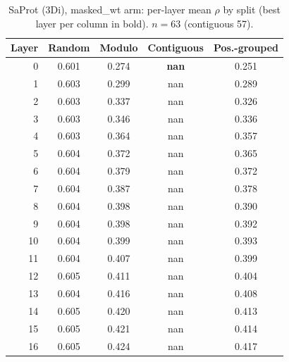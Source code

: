 \documentclass[11pt,a4paper]{article}
\begin{document}
\begin{table}[H]\centering\small

\caption{SaProt (3Di), masked\_wt arm: per-layer mean $\rho$ by split (best layer per column in bold). $n=63$ (contiguous 57).}

\label{tab:S2SaProt3Dimasked_wt}

\begin{tabular}{rcccc}

\toprule

Layer & Random & Modulo & Contiguous & Pos.-grouped \\

\midrule

0 & 0.601 & 0.274 & \textbf{nan} & 0.251 \\

1 & 0.603 & 0.299 & nan & 0.289 \\

2 & 0.603 & 0.337 & nan & 0.326 \\

3 & 0.603 & 0.346 & nan & 0.336 \\

4 & 0.603 & 0.364 & nan & 0.357 \\

5 & 0.604 & 0.372 & nan & 0.365 \\

6 & 0.604 & 0.379 & nan & 0.372 \\

7 & 0.604 & 0.387 & nan & 0.378 \\

8 & 0.604 & 0.398 & nan & 0.390 \\

9 & 0.604 & 0.398 & nan & 0.392 \\

10 & 0.604 & 0.399 & nan & 0.393 \\

11 & 0.604 & 0.407 & nan & 0.399 \\

12 & 0.605 & 0.411 & nan & 0.404 \\

13 & 0.604 & 0.416 & nan & 0.408 \\

14 & 0.605 & 0.420 & nan & 0.413 \\

15 & 0.605 & 0.421 & nan & 0.414 \\

16 & 0.605 & 0.424 & nan & 0.417 \\


\end{tabular}
\end{table}
\end{document}

